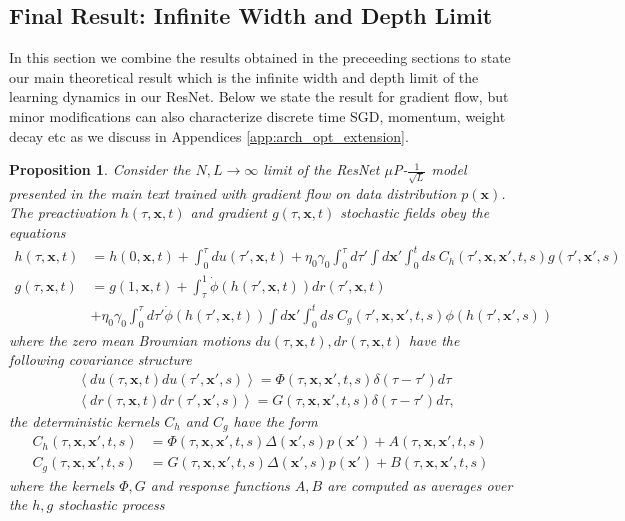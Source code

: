 \documentclass{article} %
\def\x{\bm x}
\newtheorem{proposition}{Proposition}
\begin{document}
\subsection{Final Result: Infinite Width and Depth Limit}\label{app:final_result_inf_width_depth}

In this section we combine the results obtained in the preceeding sections to state our main theoretical result which is the infinite width and depth limit of the learning dynamics in our ResNet. Below we state the result for gradient flow, but minor modifications can also characterize discrete time SGD, momentum, weight decay etc as we discuss in Appendices \ref{app:arch_opt_extension}. 
\begin{proposition}\label{prop:full_DMFT_limit}
    Consider the $N, L \to \infty$ limit of the ResNet $\mu$P-$\frac{1}{\sqrt L}$ model presented in the main text trained with gradient flow on data distribution $p(\x)$. The preactivation $h(\tau,\x,t)$ and gradient $g(\tau,\x,t)$ stochastic fields obey the equations
    \begin{align}
        h(\tau,\x,t) &= h(0,\x,t) +  \int_0^\tau du(\tau',\x,t) + \eta_0 \gamma_0 \int_0^\tau d\tau' \int d\x' \int_0^t ds \ C_h(\tau',\x,\x',t,s) g(\tau',\x',s) \nonumber
        \\
        g(\tau,\x,t) &= g(1,\x,t) +  \int_\tau^1 \dot\phi(h(\tau',\x,t)) dr(\tau',\x,t)   \nonumber
        \\
        &+ \eta_0 \gamma_0 \int_0^\tau d\tau' \dot\phi(h(\tau',\x,t)) \int d\x' \int_0^t ds \ C_g(\tau',\x,\x',t,s) \phi(h(\tau',\x',s))   
    \end{align}
where the zero mean Brownian motions $du(\tau,\x,t), dr(\tau,\x,t)$ have the following covariance structure
\begin{align}
    &\left< du(\tau,\x,t) du(\tau',\x',s) \right> = \Phi(\tau,\x,\x',t,s) \delta(\tau-\tau') d\tau \nonumber \\ 
    &\left< dr(\tau,\x,t) dr(\tau',\x',s) \right> = G(\tau,\x,\x',t,s) \delta(\tau-\tau') d\tau ,
\end{align}
the deterministic kernels $C_h$ and $C_g$ have the form 
\begin{align}
    C_h(\tau,\x,\x',t,s) &= \Phi(\tau,\x,\x',t,s) \Delta(\x',s) p(\x') + A(\tau,\x,\x',t,s) \nonumber
    \\
    C_g(\tau,\x,\x',t,s) &= G(\tau,\x,\x',t,s) \Delta(\x',s) p(\x') + B(\tau,\x,\x',t,s) 
\end{align}
where the kernels $\Phi, G$ and response functions $A,B$ are computed as averages over the $h, g$ stochastic process

\end{proposition}
\end{document}
